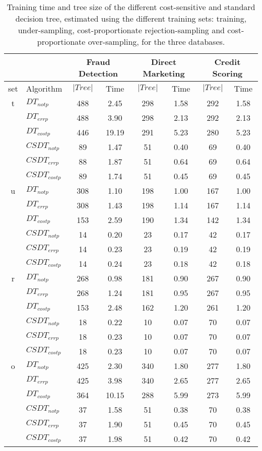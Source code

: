 \begin{table}[htbp]
  \centering
  \footnotesize
  \begin{tabular}{|c|l|c c|c c|c c|}
    \cline{3-8}
    \multicolumn{2}{c}{}& \multicolumn{2}{|c|}{Fraud Detection} & \multicolumn{2}{|c|}{Direct 
    Marketing} 
    & \multicolumn{2}{|c|}{Credit Scoring}\\
    \hline
    set&Algorithm & $\vert Tree\vert$ & Time& $\vert Tree\vert$ & Time& $\vert Tree\vert$ & Time\\
    \hline
    t &$DT_{not p}$&488&2.45&298&1.58&292&1.58\\
    &$DT_{err p}$&488&3.90&298&2.13&292&2.13\\
    &$DT_{cost p}$&446&19.19&291&5.23&280&5.23\\
    &$CSDT_{not p}$&89&1.47&51&0.40&69&0.40\\
    &$CSDT_{err p}$&88&1.87&51&0.64&69&0.64\\
    &$CSDT_{cost p}$&89&1.74&51&0.45&69&0.45\\
    \hline
    u &$DT_{not p}$&308&1.10&198&1.00&167&1.00\\
    &$DT_{err p}$&308&1.43&198&1.14&167&1.14\\
    &$DT_{cost p}$&153&2.59&190&1.34&142&1.34\\
    &$CSDT_{not p}$&14&0.20&23&0.17&42&0.17\\
    &$CSDT_{err p}$&14&0.23&23&0.19&42&0.19\\
    &$CSDT_{cost p}$&14&0.24&23&0.18&42&0.18\\
    \hline
    r &$DT_{not p}$&268&0.98&181&0.90&267&0.90\\
    &$DT_{err p}$&268&1.24&181&0.95&267&0.95\\
    &$DT_{cost p}$&153&2.48&162&1.20&261&1.20\\
    &$CSDT_{not p}$&18&0.22&10&0.07&70&0.07\\
    &$CSDT_{err p}$&18&0.23&10&0.07&70&0.07\\
    &$CSDT_{cost p}$&18&0.23&10&0.07&70&0.07\\
    \hline
    o &$DT_{not p}$&425&2.30&340&1.80&277&1.80\\
    &$DT_{err p}$&425&3.98&340&2.65&277&2.65\\
    &$DT_{cost p}$&364&10.15&288&5.99&273&5.99\\
    &$CSDT_{not p}$&37&1.58&51&0.38&70&0.38\\
    &$CSDT_{err p}$&37&1.90&51&0.45&70&0.45\\
    &$CSDT_{cost p}$&37&1.98&51&0.42&70&0.42\\
    \hline
  \end{tabular} 
  \caption{Training time and tree size of the different cost-sensitive and standard decision 
  tree, estimated using the different training sets: training, under-sampling, 
  cost-proportionate rejection-sampling and cost-proportionate over-sampling, for the three 
  databases.}
  \label{tab:8:2}
\end{table}